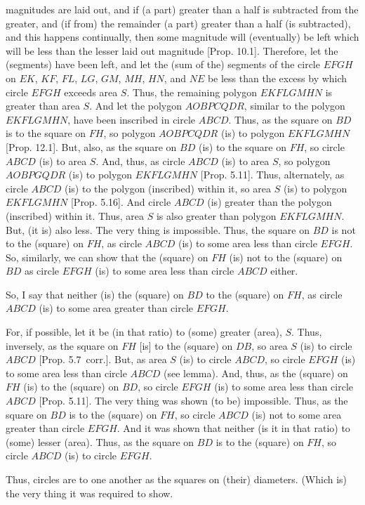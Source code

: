 \begin{Parallel}{}{}
{magnitudes are laid out, and if (a part) greater than a half is subtracted
from the greater, and (if from) the remainder (a part) greater than a
half (is subtracted), and this happens continually, then some magnitude
will (eventually) be left which will be less than the lesser laid out magnitude [Prop. 10.1]. Therefore, let the (segments) have been left, and let 
 the (sum of the) segments of the circle $EFGH$ on $EK$, $KF$, $FL$, $LG$, $GM$, $MH$, $HN$, and $NE$ be less than the excess by which  circle
 $EFGH$ exceeds  area $S$. Thus, the remaining polygon $EKFLGMHN$ is greater than area $S$. 
 And let the polygon $AOBPCQDR$,
 similar to the polygon $EKFLGMHN$, have been inscribed in circle
 $ABCD$. Thus, as the square on $BD$ is to the square on $FH$, so
polygon $AOBPCQDR$ (is) to polygon $EKFLGMHN$ [Prop. 12.1]. But, also, as the square on $BD$ (is) to the square on $FH$, so circle $ABCD$ (is) to area $S$. And, thus, as
circle $ABCD$ (is) to area $S$, so polygon $AOBPGQDR$ (is) to
polygon $EKFLGMHN$ [Prop. 5.11]. Thus, alternately, as circle $ABCD$
(is) to the polygon (inscribed) within it, so area $S$ (is) to polygon $EKFLGMHN$
[Prop. 5.16]. And circle $ABCD$ (is)
greater than the polygon (inscribed) within it. Thus, area $S$ is also greater than polygon 
$EKFLGMHN$. But, (it is) also less. The very thing
is impossible. Thus, the square on $BD$ is not to the (square) on $FH$, as
circle $ABCD$ (is) to some area less than circle $EFGH$. So, similarly,
we can show that the (square) on $FH$ (is) not to the (square) on 
$BD$ as circle $EFGH$ (is) to some area less than circle $ABCD$ either.

So, I say that neither (is) the (square) on $BD$ to the (square) on $FH$,
as circle $ABCD$ (is) to some area greater than circle $EFGH$.

For, if possible, let it be (in that ratio) to (some)  greater (area), $S$. Thus, inversely, 
as the square on $FH$ [is] to the (square) on $DB$, so area $S$ (is) to circle $ABCD$ [Prop. 5.7~corr.]. But, as area $S$ (is) to circle $ABCD$, so circle $EFGH$
(is) to some area less than circle $ABCD$ (see lemma). And, thus, as the (square) on $FH$ (is) to the (square) on $BD$, so circle $EFGH$ (is) to some area
less than  circle $ABCD$ [Prop. 5.11]. The very thing was shown (to be) impossible.
Thus, as the square on $BD$ is to the (square) on $FH$, so circle $ABCD$
(is) not to some area greater than circle $EFGH$. And it was shown that neither (is it in that ratio) to (some) lesser (area). Thus, as the square on $BD$ is to the (square) on $FH$, so circle $ABCD$ (is) to circle $EFGH$.

Thus, circles are to one another as the squares on (their) diameters. (Which is) the very thing it was required to show.}
\end{Parallel}

